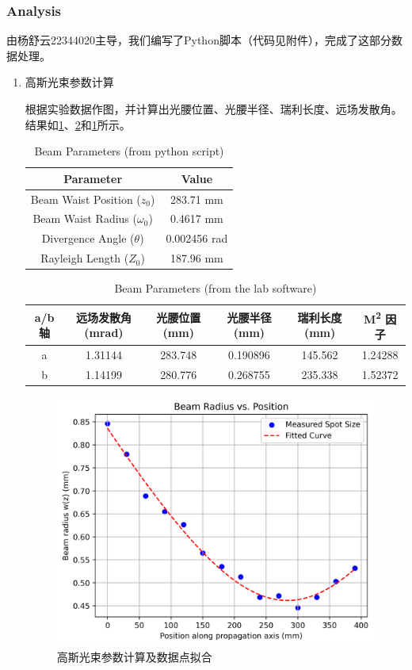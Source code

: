 \subsubsection{Analysis}
由杨舒云22344020主导，我们编写了Python脚本（代码见附件），完成了这部分数据处理。
\begin{enumerate}
	\item 高斯光束参数计算
	
	根据实验数据作图，并计算出光腰位置、光腰半径、瑞利长度、远场发散角。结果如\cref{tab:exp3-a-1}、\cref{tab:exp3-a-2}和\cref{fig:apl18exp3analysis}所示。
	
	\begin{table}[h!]
		\centering
		\renewcommand{\arraystretch}{1.5} %
		\caption{Beam Parameters (from python script)}
		\label{tab:exp3-a-1}
		\begin{tabular}{|c|c|}
			\hline
			\textbf{Parameter} & \textbf{Value} \\ \hline
			Beam Waist Position ($z_0$) & 283.71 mm \\ \hline
			Beam Waist Radius ($\omega_0$) & 0.4617 mm \\ \hline
			Divergence Angle ($\theta$) & 0.002456 rad \\ \hline
			Rayleigh Length ($Z_0$) & 187.96 mm \\ \hline
		\end{tabular}
	\end{table}
	
	\begin{table}[h!]
		\centering
		\renewcommand{\arraystretch}{1.5} %
		\caption{Beam Parameters (from the lab software)}
		\label{tab:exp3-a-2}
		\begin{tabular}{|c|c|c|c|c|c|}
			\hline
			\textbf{a/b 轴} & \textbf{远场发散角 (mrad)} & \textbf{光腰位置 (mm)} & \textbf{光腰半径 (mm)} & \textbf{瑞利长度 (mm)} & \textbf{M\textsuperscript{2} 因子} \\ \hline
			a & 1.31144 & 283.748 & 0.190896 & 145.562 & 1.24288 \\ \hline
			b & 1.14199 & 280.776 & 0.268755 & 235.338 & 1.52372 \\ \hline
		\end{tabular}
	\end{table}
	
	\begin{figure}[h!]
		\centering
		\includegraphics[width=0.6\linewidth]{images/APL1_8_exp3_analysis}
		\caption{高斯光束参数计算及数据点拟合}
		\label{fig:apl18exp3analysis}
	\end{figure}
	

\end{enumerate}
